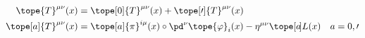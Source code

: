 \begin{equation}	\label{12.3}
	\begin{split}
\tope{T}^{\mu\nu}(x)
&=
\tope[0]{T}^{\mu\nu}(x) + \tope[\prime]{T}^{\mu\nu}(x)
\\
\tope[a]{T}^{\mu\nu}(x)
&=
\tope[a]{\pi}^{i\mu}(x) \circ \pd^\nu\tope{\varphi}_i(x)
		- \eta^{\mu\nu} \tope[a\mspace{-3mu}]{L}(x)
\quad
a=0,\prime
	\end{split}
	\end{equation}

